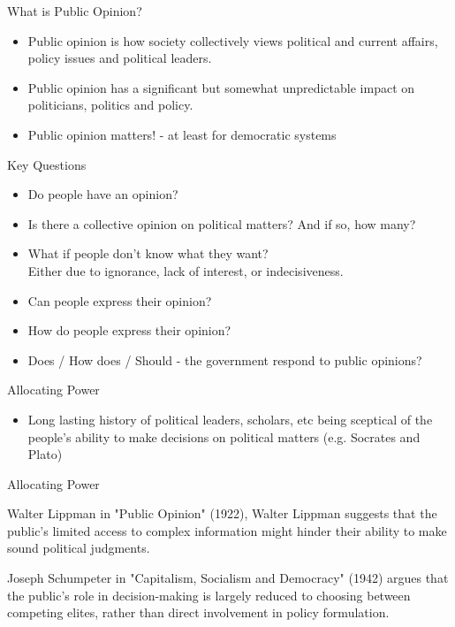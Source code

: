\documentclass{beamer}
\begin{document}
\begin{frame}{What is Public Opinion?}
\begin{itemize}
    \item  Public opinion is how society collectively views political and current affairs, policy issues and political leaders. 
    \item Public opinion has a significant but somewhat unpredictable impact on politicians, politics and policy.
    \item  Public opinion matters! - at least for democratic systems
\end{itemize}
\end{frame}


\begin{frame}{Key Questions}
\begin{itemize}
    \item Do people have an opinion?
    \item Is there a collective opinion on political matters? And if so, how many?
    \item What if people don't know what they want?\\ Either due to ignorance, lack of interest, or indecisiveness.
    \item Can people express their opinion?
    \item How do people express their opinion?
    \item Does / How does / Should - the government respond to public opinions?
\end{itemize}
\end{frame}


\begin{frame}{Allocating Power}
\begin{itemize}
    \item Long lasting history of political leaders, scholars, etc being sceptical of the people's ability to make decisions on political matters (e.g. Socrates and Plato)
\end{itemize}
\end{frame}


\begin{frame}{Allocating Power}
\begin{block}{Walter Lippman}
in "Public Opinion" (1922), Walter Lippman suggests that the public's limited access to complex information might hinder their ability to make sound political judgments.
\end{block}

\begin{block}{ Joseph Schumpeter }
in "Capitalism, Socialism and Democracy" (1942) argues that the public's role in decision-making is largely reduced to choosing between competing elites, rather than direct involvement in policy formulation.
\end{block}
\end{frame}
\end{document}
